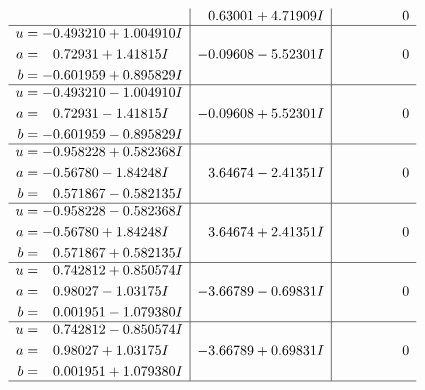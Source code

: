 \documentclass[1p]{elsarticle_modified}
\theoremstyle{definition}
\begin{document}
$$\begin{array}{c|c|c}
 & \phantom{-}0.63001 + 4.71909 I & \phantom{-0.000000 } 0 \\ \hline\begin{aligned}
u &= -0.493210 + 1.004910 I \\
a &= \phantom{-}0.72931 + 1.41815 I \\
b &= -0.601959 + 0.895829 I\end{aligned}
 & -0.09608 - 5.52301 I & \phantom{-0.000000 } 0 \\ \hline\begin{aligned}
u &= -0.493210 - 1.004910 I \\
a &= \phantom{-}0.72931 - 1.41815 I \\
b &= -0.601959 - 0.895829 I\end{aligned}
 & -0.09608 + 5.52301 I & \phantom{-0.000000 } 0 \\ \hline\begin{aligned}
u &= -0.958228 + 0.582368 I \\
a &= -0.56780 - 1.84248 I \\
b &= \phantom{-}0.571867 - 0.582135 I\end{aligned}
 & \phantom{-}3.64674 - 2.41351 I & \phantom{-0.000000 } 0 \\ \hline\begin{aligned}
u &= -0.958228 - 0.582368 I \\
a &= -0.56780 + 1.84248 I \\
b &= \phantom{-}0.571867 + 0.582135 I\end{aligned}
 & \phantom{-}3.64674 + 2.41351 I & \phantom{-0.000000 } 0 \\ \hline\begin{aligned}
u &= \phantom{-}0.742812 + 0.850574 I \\
a &= \phantom{-}0.98027 - 1.03175 I \\
b &= \phantom{-}0.001951 - 1.079380 I\end{aligned}
 & -3.66789 - 0.69831 I & \phantom{-0.000000 } 0 \\ \hline\begin{aligned}
u &= \phantom{-}0.742812 - 0.850574 I \\
a &= \phantom{-}0.98027 + 1.03175 I \\
b &= \phantom{-}0.001951 + 1.079380 I\end{aligned}
 & -3.66789 + 0.69831 I & \phantom{-0.000000 } 0\\
 \hline 
 \end{array}$$\newpage$$\begin{array}{c|c|c}  

\end{array}$$
\end{document}
